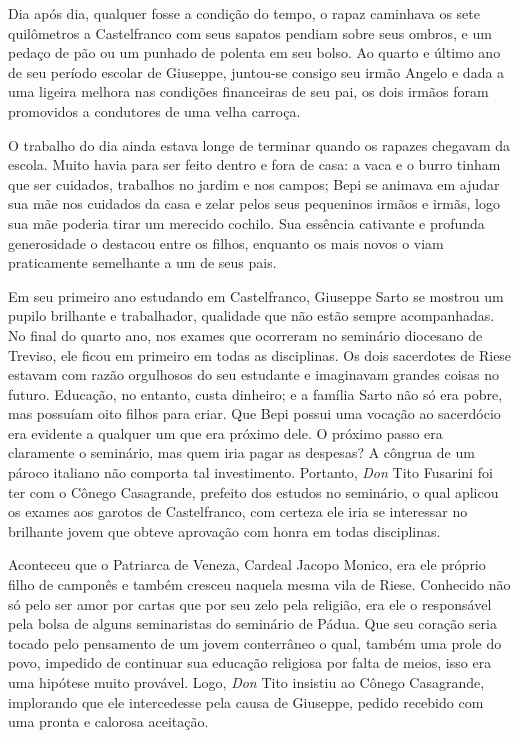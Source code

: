 \documentclass[12pt,a4paper,oneside]{book}
\begin{document}
\quad Dia após dia, qualquer fosse a condição do tempo, o rapaz caminhava os sete quilômetros a Castelfranco   com seus sapatos pendiam sobre seus ombros, e um pedaço de pão ou um punhado de polenta em seu bolso. Ao quarto e último ano de seu período escolar de Giuseppe, juntou-se consigo seu irmão Angelo e dada a uma ligeira melhora nas condições financeiras de seu pai, os dois irmãos foram promovidos a condutores de uma velha carroça.

\quad O trabalho do dia ainda estava longe de terminar quando os rapazes chegavam da escola. Muito havia para ser feito dentro e fora de casa: a vaca e o burro tinham que ser cuidados, trabalhos no jardim e nos campos; Bepi se animava em ajudar sua mãe nos cuidados da casa e zelar pelos seus pequeninos irmãos e irmãs, logo sua mãe poderia tirar um merecido cochilo. Sua essência cativante e profunda generosidade o destacou entre os filhos, enquanto os mais novos o viam praticamente semelhante a um de seus pais.

\quad Em seu primeiro ano estudando em Castelfranco, Giuseppe Sarto se mostrou um pupilo brilhante e trabalhador, qualidade que não estão sempre acompanhadas. No final do quarto ano, nos exames que ocorreram no seminário diocesano de Treviso, ele ficou em primeiro em todas as disciplinas. Os dois sacerdotes de Riese estavam com razão orgulhosos do seu estudante e imaginavam grandes coisas no futuro. Educação, no entanto, custa dinheiro; e a família Sarto não só era pobre, mas possuíam oito filhos para criar. Que Bepi possui uma vocação ao sacerdócio era evidente a qualquer um que era próximo dele. O próximo passo era claramente o seminário, mas quem iria pagar as despesas? A côngrua de um pároco italiano não comporta tal investimento. Portanto, \emph{Don} Tito Fusarini foi ter com o Cônego Casagrande, prefeito dos estudos no seminário, o qual aplicou os exames aos garotos de Castelfranco, com certeza ele iria se interessar no brilhante jovem que obteve aprovação com honra em todas disciplinas.

\quad Aconteceu que o Patriarca de Veneza, Cardeal Jacopo Monico, era ele próprio filho de camponês e também cresceu naquela mesma vila de Riese. Conhecido não só pelo ser amor por cartas que por seu zelo pela religião, era ele o responsável pela bolsa de alguns seminaristas do seminário de Pádua. Que seu coração seria tocado pelo pensamento de um jovem conterrâneo o qual, também uma prole do povo, impedido de continuar sua educação religiosa por falta de meios, isso era uma hipótese muito provável. Logo, \emph{Don} Tito insistiu ao Cônego Casagrande, implorando que ele intercedesse pela causa de Giuseppe, pedido recebido com uma pronta e calorosa aceitação.
\end{document}
